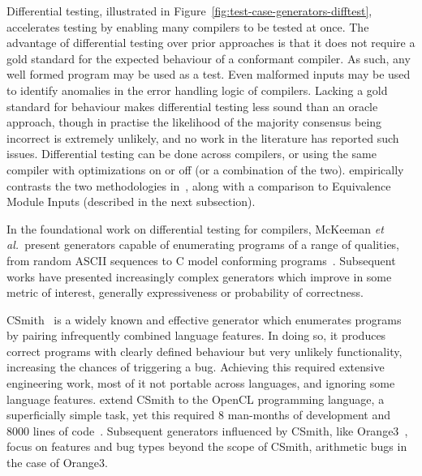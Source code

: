 Differential testing, illustrated in Figure~\ref{fig:test-case-generators-difftest}, accelerates testing by enabling many compilers to be tested at once. The advantage of differential testing over prior approaches is that it does not require a gold standard for the expected behaviour of a conformant compiler. As such, any well formed program may be used as a test. Even malformed inputs may be used to identify anomalies in the error handling logic of compilers. Lacking a gold standard for behaviour makes differential testing less sound than an oracle approach, though in practise the likelihood of the majority consensus being incorrect is extremely unlikely, and no work in the literature has reported such issues. Differential testing can be done across compilers, or using the same compiler with optimizations on or off (or a combination of the two). \citeauthor{Chen2014a} empirically contrasts the two methodologies in~\cite{Chen2014a}, along with a comparison to Equivalence Module Inputs (described in the next subsection).

In the foundational work on differential testing for compilers, McKeeman \emph{et al.\ }present generators capable of enumerating programs of a range of qualities, from random ASCII sequences to C model conforming programs~\cite{McKeeman1998}. Subsequent works have presented increasingly complex generators which improve in some metric of interest, generally expressiveness or probability of correctness.

CSmith~\cite{Yang2011} is a widely known and effective generator which enumerates programs by pairing infrequently combined language features. In doing so, it produces correct programs with clearly defined behaviour but very unlikely functionality, increasing the chances of triggering a bug. Achieving this required extensive engineering work, most of it not portable across languages, and ignoring some language features.
\citeauthor{Lidbury2015a} extend CSmith to the OpenCL programming language, a superficially simple task, yet this required 8 man-months of development and 8000 lines of code~\cite{Lidbury2015a}.
Subsequent generators influenced by CSmith, like Orange3~\cite{Nagai2013}, focus on features and bug types beyond the scope of CSmith, arithmetic bugs in the case of Orange3.

